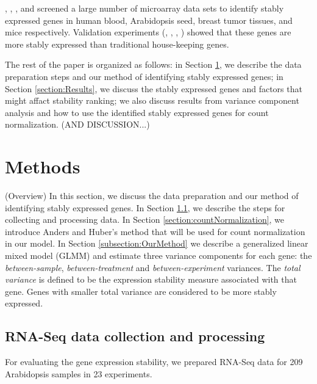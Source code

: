 \documentclass[11pt, a4paper]{article}
\begin{document}
\cite{stamova2009identification},  \citet{dekkers2012identification}, \citet{gur2009identification}, and
 \citet{frericks2008toolbox} screened a large number of microarray data sets
 to identify stably expressed genes in human blood, Arabidopsis seed, breast tumor tissues,
 and mice respectively.
Validation experiments (\cite{czechowski2005genome},
\cite{dekkers2012identification}, \cite{huggett2005real},
\cite{stamova2009identification}) showed that these genes are more stably
expressed than traditional house-keeping genes.  




The rest of the paper is organized as follows: in Section \ref{section:Methods}, we describe the data preparation steps and our method of identifying stably expressed genes; in Section \ref{section:Results}, we discuss the stably expressed genes and factors that might affact stability ranking; we also discuss results from variance component analysis and how to use the identified stably expressed genes for count normalization. (AND DISCUSSION...)


\section{Methods} \label{section:Methods}
(Overview) In this section, we discuss the data preparation and our method of
identifying stably expressed genes. In Section \ref{section:DataCollection},
we describe the steps for collecting and processing data. In Section
\ref{section:countNormalization}, we introduce Anders and Huber's method that
will be used for count normalization in our model. In Section
\ref{subsection:OurMethod}  we describe a generalized linear mixed model (GLMM) \citep{mccullagh1989generalized} and estimate three variance components for each gene: the \textit{between-sample}, \textit{between-treatment} and \textit{between-experiment} variances.
 The \textit{total variance} is defined to be the expression stability measure associated with that gene. Genes with smaller total variance are considered to be more stably expressed. 



\subsection{RNA-Seq data collection and processing}\label{section:DataCollection}
For evaluating the gene expression stability, we prepared RNA-Seq data for 209
Arabidopsis samples in 23 experiments.
\end{document}
